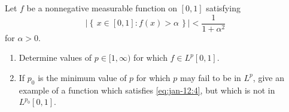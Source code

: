 \begin{problem}
Let $f$ be a nonnegative measurable function on $[0,1]$ satisfying
\begin{equation}
  \label{eq:jan-12:4}
\left|\left\{\,x\in[0,1]:f(x)>\alpha\,\right\}\right|<\frac{1}{1+\alpha^2}
\end{equation}
for $\alpha>0$.
\begin{enumerate}[label=(\alph*),noitemsep]
\item Determine values of $p\in[1,\infty)$ for which $f\in L^p[0,1]$.
\item If $p_0$ is the minimum value of $p$ for which $p$ may fail to be in
  $L^p$, give an example of a function which satisfies \eqref{eq:jan-12:4},
  but which is not in $L^{p_0}[0,1]$.
\end{enumerate}
\end{problem}
\begin{solution}
\end{solution}

